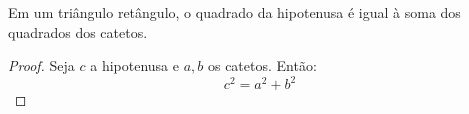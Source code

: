 

\begin{theorem}[Pitágoras]
\label{thm:pitagoras}
Em um triângulo retângulo, o quadrado da hipotenusa é igual à soma dos quadrados dos catetos.
\end{theorem}

\begin{proof}
Seja $c$ a hipotenusa e $a, b$ os catetos. Então:
\begin{equation}
    c^2 = a^2 + b^2
\end{equation}
\end{proof}







